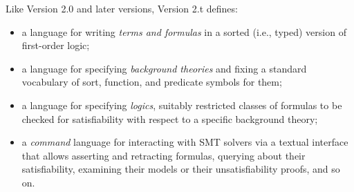 Like Version 2.0 and later versions, Version 2.t defines:
\begin{itemize}
\item
a language for writing \emph{terms and formulas} in a sorted (i.e., typed) 
version of first-order logic;
\item
a language for specifying \emph{background theories} and 
fixing a standard vocabulary of sort, function, and predicate symbols for them;
\item
a language for specifying \emph{logics}, 
suitably restricted classes of formulas to be checked 
for satisfiability with respect to a specific background theory;
\item
a \emph{command} language for interacting with SMT solvers
via a textual interface
that allows asserting and retracting formulas, 
querying about their satisfiability, examining their models or 
their unsatisfiability proofs, and so on.

\end{itemize}

